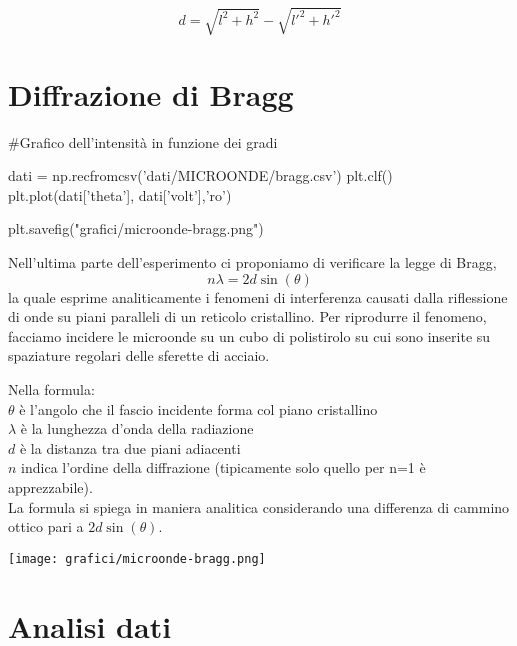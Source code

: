 $$ d = \sqrt{l^2 + h^2} - \sqrt{l'^2 + h'^2} $$

\begin{center}
\end{center}

\section{Diffrazione di Bragg}

\begin{sagesilent}
#Grafico dell'intensità in funzione dei gradi

dati = np.recfromcsv('dati/MICROONDE/bragg.csv')
plt.clf()
plt.plot(dati['theta'], dati['volt'],'ro')

plt.savefig("grafici/microonde-bragg.png")

\end{sagesilent}


Nell'ultima parte dell'esperimento ci proponiamo di verificare la legge di Bragg, 
\begin{equation}
n \lambda = 2 d \sin(\theta)
\end{equation}
la quale esprime analiticamente i fenomeni di interferenza causati dalla riflessione di onde su piani paralleli di un reticolo cristallino. Per riprodurre il fenomeno, facciamo incidere le microonde su un cubo di polistirolo su cui sono inserite su spaziature regolari delle sferette di acciaio.

Nella formula:\\
$\theta$ è l'angolo che il fascio incidente forma col piano cristallino\\
$\lambda$ è la lunghezza d'onda della radiazione\\
$d$ è la distanza tra due piani adiacenti\\
$n$ indica l'ordine della diffrazione (tipicamente solo quello per n=1 è apprezzabile).\\

La formula si spiega in maniera analitica considerando una differenza di cammino ottico pari a $2d\sin(\theta)$.


\texttt{[image: grafici/microonde-bragg.png]}

\section{Analisi dati}

